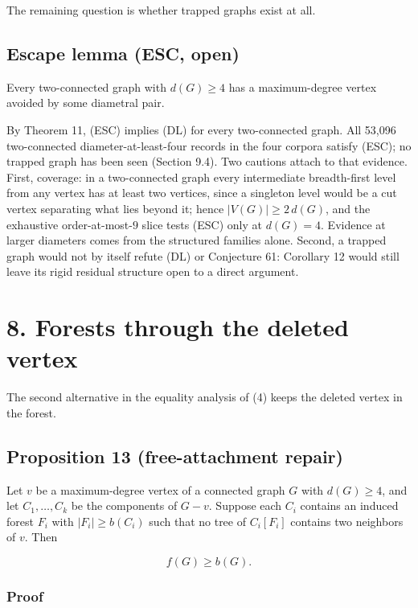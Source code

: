 \documentclass[
  11pt,
  letterpaper,
]{article}
\begin{document}
The remaining question is whether trapped graphs exist at all.

\subsection{Escape lemma (ESC, open)}\label{escape-lemma-esc-open}

Every two-connected graph with \(d(G)\ge4\) has a maximum-degree vertex
avoided by some diametral pair.

By Theorem 11, (ESC) implies (DL) for every two-connected graph. All
53,096 two-connected diameter-at-least-four records in the four corpora
satisfy (ESC); no trapped graph has been seen (Section 9.4). Two
cautions attach to that evidence. First, coverage: in a two-connected
graph every intermediate breadth-first level from any vertex has at
least two vertices, since a singleton level would be a cut vertex
separating what lies beyond it; hence \(|V(G)|\ge2\,d(G)\), and the
exhaustive order-at-most-\(9\) slice tests (ESC) only at \(d(G)=4\).
Evidence at larger diameters comes from the structured families alone.
Second, a trapped graph would not by itself refute (DL) or Conjecture
61: Corollary 12 would still leave its rigid residual structure open to
a direct argument.

\section{8. Forests through the deleted
vertex}\label{forests-through-the-deleted-vertex}

The second alternative in the equality analysis of (4) keeps the deleted
vertex in the forest.

\subsection{Proposition 13 (free-attachment
repair)}\label{proposition-13-free-attachment-repair}

Let \(v\) be a maximum-degree vertex of a connected graph \(G\) with
\(d(G)\ge4\), and let \(C_1,\ldots,C_k\) be the components of \(G-v\).
Suppose each \(C_i\) contains an induced forest \(F_i\) with
\(|F_i|\ge b(C_i)\) such that no tree of \(C_i[F_i]\) contains two
neighbors of \(v\). Then

\[
f(G)\ge b(G).
\]

\subsubsection{Proof}\label{proof-12}
\end{document}
